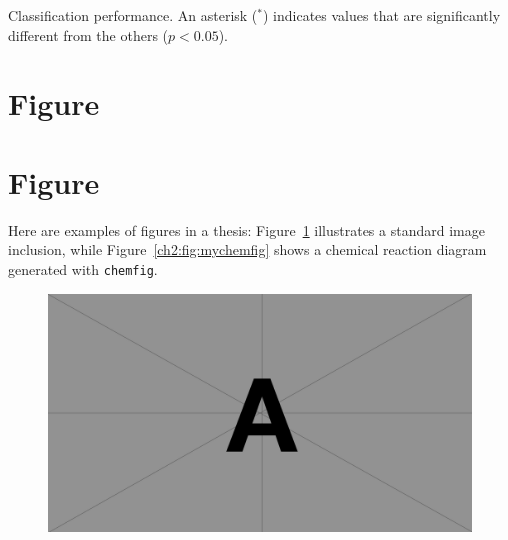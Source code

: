 \begin{table}[ht]
\caption{Classification performance. An asterisk ($^*$) indicates values that are significantly different from the others ($p<0.05$).}
\label{ch2:table:results}
\centering
\normalsize\singlespacingplus

\end{table}





\section{Figure}

\section{Figure}

\begin{paragraph}
Here are examples of figures in a thesis: Figure~\ref{ch2:fig:fig-A} illustrates a standard image inclusion, while Figure~\ref{ch2:fig:mychemfig} shows a chemical reaction diagram generated with \texttt{chemfig}.
\end{paragraph}



\begin{figure}[ht]
    \centering
    \includegraphics[width=1\columnwidth]{figures/ch2/A.pdf} %
    \label{ch2:fig:fig-A}
\end{figure}



